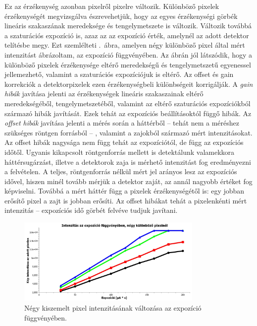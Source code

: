 \documentclass[a4paper,12pt]{article}
\begin{document}
Ez az érzékenység azonban pixelről pixelre változik. Különböző pixelek érzékenységét megvizsgálva észrevehetjük, hogy az egyes érzékenységi görbék lineáris szakaszának meredeksége és tengelymetszete is változik. Változik továbbá a szaturációs expozíció is, azaz az az expozíció érték, amelynél az adott detektor telítésbe megy. Ezt szemlélteti .~ábra, amelyen négy különböző pixel által mért intenzitást ábrázoltam, az expozíció függvényében. Az ábrán jól látszódik, hogy a különböző pixelek érzékenysége eltérő meredekségű és tengelymetszetű egyenessel jellemezhető, valamint a szaturációs expozíciójuk is eltérő. Az offset és gain korrekciók a detektorpixelek ezen érzékenységbeli különbségeit korrigálják. A \emph{gain hibák} javítása jelenti az érzékenységek lineáris szakaszainak eltérő meredekségéből, tengelymetszetéből, valamint az eltérő szaturációs expozíciókból származó hibák javítását. Ezek tehát az expozíciós beállításoktól függő hibák.
Az \emph{offset hibák} javítása jelenti a mérés során a háttérből -- tehát nem a méréshez szükséges röntgen forrásból -- , valamint a zajokból származó mért intenzitásokat.  Az offset  hibák nagysága nem függ tehát az expozíciótól, de függ az expozíciós időtől. Ugyanis kikapcsolt röntgenforrás mellett is detektálunk valamekkora háttérsugárzást, illetve a detektorok zaja is mérhető intenzitást fog eredményezni a felvételen. A teljes, röntgenforrás nélkül mért jel arányos lesz az expozíciós idővel, hiszen minél tovább mérjük a detektor zaját, az annál nagyobb értéket fog képviselni. Továbbá a mért háttér függ a pixelek érzékenységétől is: egy jobban erősítő pixel a zajt is jobban erősíti. Az offset hibákat  tehát a pixelenkénti mért intenzitás -- expozíciós idő görbét felvéve tudjuk javítani.





\begin{figure}[htbp]
\center
\includegraphics[width=0.8\textwidth]{abrak/gaingrafikon}
\caption{Négy kiszemelt pixel intenzitásának változása az expozíció függvényében.}
\label{fig:gaingrafikon}
\end{figure}
\end{document}
